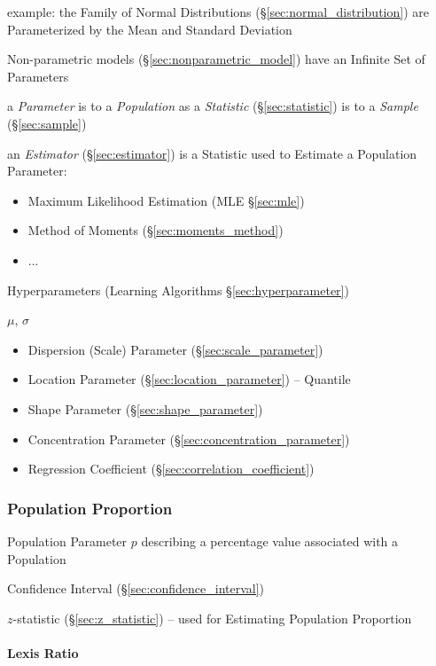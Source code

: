 example: the Family of Normal Distributions (\S\ref{sec:normal_distribution})
are Parameterized by the Mean and Standard Deviation

Non-parametric models (\S\ref{sec:nonparametric_model}) have an Infinite Set of
Parameters

a \emph{Parameter} is to a \emph{Population} as a \emph{Statistic}
(\S\ref{sec:statistic}) is to a \emph{Sample} (\S\ref{sec:sample})

\fist an \emph{Estimator} (\S\ref{sec:estimator}) is a Statistic used to
Estimate a Population Parameter:
\begin{itemize}
  \item Maximum Likelihood Estimation (MLE \S\ref{sec:mle})
  \item Method of Moments (\S\ref{sec:moments_method})
  \item ...
\end{itemize}

\fist Hyperparameters (Learning Algorithms \S\ref{sec:hyperparameter})

$\mu$, $\sigma$

\begin{itemize}
  \item Dispersion (Scale) Parameter (\S\ref{sec:scale_parameter})
  \item Location Parameter (\S\ref{sec:location_parameter}) -- Quantile
  \item Shape Parameter (\S\ref{sec:shape_parameter})
  \item Concentration Parameter (\S\ref{sec:concentration_parameter})
  \item Regression Coefficient (\S\ref{sec:correlation_coefficient})
\end{itemize}



\subsubsection{Population Proportion}\label{sec:proportion}

Population Parameter $p$ describing a percentage value associated with a
Population

\fist Confidence Interval (\S\ref{sec:confidence_interval})

$z$-statistic (\S\ref{sec:z_statistic}) -- used for Estimating Population
Proportion



\paragraph{Lexis Ratio}\label{sec:lexis_ratio}\hfill



